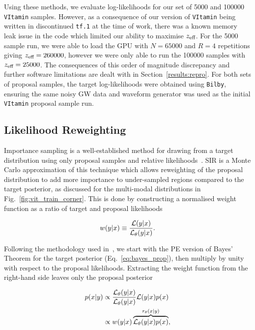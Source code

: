 \documentclass[a4paper]{jpconf}
\begin{document}
Using these methods, we evaluate log-likelihoods for our set of 5000 and 100000 \texttt{VItamin} samples. However, as a consequence of our version of \texttt{VItamin} being written in discontinued \texttt{tf.1} at the time of work, there was a known memory leak issue in the code which limited our ability to maximise $z_\textup{eff}$. For the 5000 sample run, we were able to load the GPU with $N=65000$ and $R=4$ repetitions giving $z_\textup{eff}=260000$, however we were only able to run the 100000 samples with $z_\textup{eff}=25000$. The consequences of this order of magnitude discrepancy and further software limitations are dealt with in Section~\ref{results:repro}. For both sets of proposal samples, the target log-likelihoods were obtained using \texttt{Bilby}, ensuring the same noisy GW data and waveform generator was used as the initial \texttt{VItamin} proposal sample run.

\subsection{Likelihood Reweighting}\label{method:reweighting}

Importance sampling is a well-established method for drawing from a target distribution using only proposal samples and relative likelihoods~\cite{1592027}. \ac{SIR} is a Monte Carlo approximation of this technique which allows reweighting of the proposal distribution to add more importance to under-sampled regions compared to the target posterior, as discussed for the multi-modal distributions in Fig.~\ref{fig:vit_train_corner}. This is done by constructing a normalised weight function as a ratio of target and proposal likelihoods

\begin{align}\label{eq:weights}
w(y|x) \equiv \frac{{\cal L}(y|x)}{{\cal L}_{\theta}(y|x)}.
\end{align}

Following the methodology used in~\cite{resample_aus}, we start with the \ac{PE} version of Bayes’ Theorem for the target posterior (Eq.~\ref{eq:bayes_prop}), then multiply by unity with respect to the proposal likelihoods. Extracting the weight function from the right-hand side leaves only the proposal posterior

\begin{align}\label{eq:sir} 
p(x|y) &\propto \frac{{\cal L}_\theta(y|x)}{{\cal L}_\theta(y|x)}{\cal L}(y|x) p(x)\nonumber\\
&\propto w(y|x)\overbrace{{\cal L}_{\theta}(y|x) p(x)}^{r_{\theta}(x|y)},
\end{align}
\end{document}
